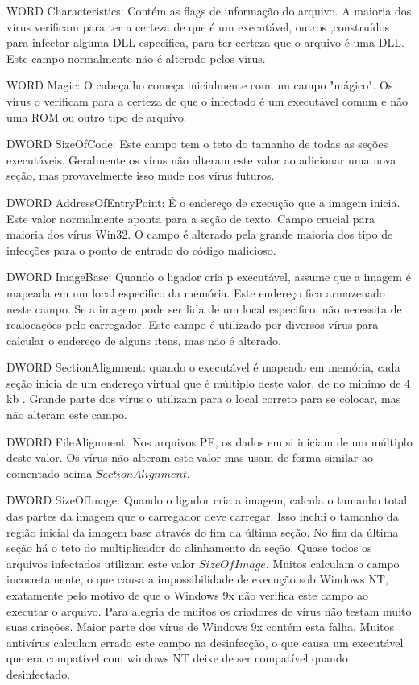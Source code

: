 WORD Characteristics: Contém as flags de informação do arquivo. A maioria dos vírus
 verificam para ter a certeza de que é um executável, outros ,construídos para infectar
 alguma DLL especifica, para ter certeza que o arquivo é uma DLL. Este campo normalmente
 não é alterado pelos vírus.

WORD Magic: O cabeçalho começa inicialmente com um campo "mágico". Os vírus o verificam
 para a certeza de que o infectado é um executável comum e não uma ROM ou outro tipo de arquivo.

DWORD SizeOfCode: Este campo tem o teto do tamanho de todas as seções executáveis.
 Geralmente os vírus não alteram este valor ao adicionar uma nova seção, mas provavelmente
 isso mude nos vírus futuros.

DWORD AddressOfEntryPoint:  É o endereço  de execução que a imagem inicia. Este valor
 normalmente aponta para a seção de texto. Campo crucial para maioria dos vírus Win32.
 O campo é alterado pela grande maioria dos tipo de infecções para o ponto de entrado do código malicioso.
 
DWORD ImageBase: Quando o ligador cria p executável, assume que a imagem é mapeada em um local especifico da memória.
 Este endereço fica armazenado neste campo. Se a imagem pode ser lida de um local especifico, não necessita de realocações pelo carregador.
 Este campo é utilizado por diversos vírus para calcular o endereço de alguns itens, mas não é alterado.

DWORD SectionAlignment: quando o executável é mapeado em memória, cada seção inicia de um endereço virtual que é múltiplo deste valor, de no minimo de 4 kb . Grande parte
 dos vírus o utilizam para o local correto para se colocar, mas não alteram este campo.

DWORD FileAlignment: Nos arquivos PE, os dados em si iniciam de um múltiplo deste valor. Os vírus não alteram este valor mas usam de forma similar ao comentado acima \(SectionAlignment\).

DWORD SizeOfImage: Quando o ligador cria a imagem, calcula o tamanho total das partes da imagem que o carregador deve carregar.
 Isso inclui o tamanho da região inicial da imagem base através do fim da última seção. No fim da última seção há o teto do multiplicador do alinhamento da seção.
 Quase todos os arquivos infectados utilizam este valor \(SizeOfImage\). Muitos calculam o campo incorretamente, o que causa a impossibilidade de execução sob Windows NT,
 exatamente pelo motivo de que o Windows 9x não verifica este campo ao executar o arquivo. Para alegria de muitos os criadores de vírus não testam muito suas criações. Maior parte
 dos vírus de Windows 9x contém esta falha. Muitos antivírus calculam errado este campo na desinfecção, o que causa um executável que era compatível com windows NT deixe de ser compatível 
 quando desinfectado.

